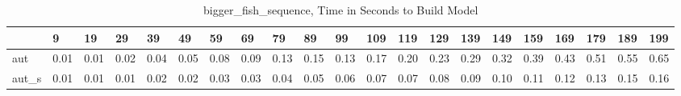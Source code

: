 \begin{table}
\centering
\caption{bigger_fish_sequence, Time in Seconds to Build Model}
\label{bigger_fish_sequence_model_time}
\begin{tabular}{lllllllllllllllllllll}
\toprule
{} &     9 &    19 &    29 &    39 &    49 &    59 &    69 &    79 &    89 &    99 &   109 &   119 &   129 &   139 &   149 &   159 &   169 &   179 &   189 &   199 \\
\midrule
aut   &  0.01 &  0.01 &  0.02 &  0.04 &  0.05 &  0.08 &  0.09 &  0.13 &  0.15 &  0.13 &  0.17 &  0.20 &  0.23 &  0.29 &  0.32 &  0.39 &  0.43 &  0.51 &  0.55 &  0.65 \\
aut\_s &  0.01 &  0.01 &  0.01 &  0.02 &  0.02 &  0.03 &  0.03 &  0.04 &  0.05 &  0.06 &  0.07 &  0.07 &  0.08 &  0.09 &  0.10 &  0.11 &  0.12 &  0.13 &  0.15 &  0.16 \\
\bottomrule
\end{tabular}
\end{table}
